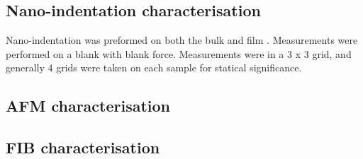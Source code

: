 \documentclass[a4paper,12pt,oneside]{report}%
\begin{document}
\subsection{Nano-indentation characterisation}
Nano-indentation was preformed on both the bulk and film \MgZnCa. Measurements were performed on a blank with blank force. Measurements were in a 3 x 3 grid, and generally 4 grids were taken on each sample for statical significance. 

\subsection{AFM characterisation}

\subsection{FIB characterisation}



\end{document}
